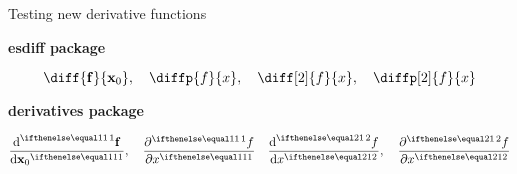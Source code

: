 \documentclass{article}
\begin{document}
Testing new derivative functions

\textbf{esdiff package}

$$\diff{\vec{f}}{\vec{x}_0}, \quad \diffp{f}{x}, \quad \diff[2]{f}{x}, \quad \diffp[2]{f}{x}$$

\textbf{derivatives package}

$$\der{\vec{f}}{\vec{x}_0}, \quad \pder{f}{x} \quad \der[2]{f}{x}, \quad \pder[2]{f}{x}$$
\end{document}
